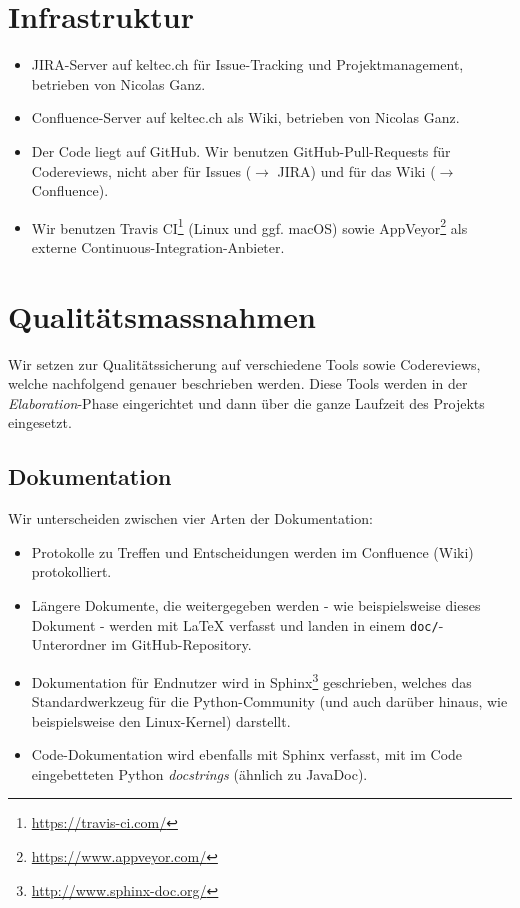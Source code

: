 \documentclass[a4paper]{article}
\let\oldsection\section
\renewcommand\section{\clearpage\oldsection}
\begin{document}
\oldsection{Infrastruktur}
\begin{itemize}
  \item JIRA-Server auf keltec.ch für Issue-Tracking und Projektmanagement, betrieben von Nicolas Ganz.
  \item Confluence-Server auf keltec.ch als Wiki, betrieben von Nicolas Ganz.
  \item Der Code liegt auf GitHub.
    Wir benutzen GitHub-Pull-Requests für Codereviews, nicht aber für Issues ($\rightarrow$ JIRA)
    und für das Wiki ($\rightarrow$ Confluence).
  \item Wir benutzen Travis CI\footnote{\url{https://travis-ci.com/}} (Linux und
    ggf. macOS) sowie AppVeyor\footnote{\url{https://www.appveyor.com/}} als
    externe Continuous-Integration-Anbieter.
\end{itemize}

\section{Qualitätsmassnahmen}
%

Wir setzen zur Qualitätssicherung auf verschiedene Tools sowie Codereviews,
welche nachfolgend genauer beschrieben werden. Diese Tools werden in der
\emph{Elaboration}-Phase eingerichtet und dann über die ganze Laufzeit des Projekts
eingesetzt.

\subsection{Dokumentation}

Wir unterscheiden zwischen vier Arten der Dokumentation:

\begin{itemize}
  \item Protokolle zu Treffen und Entscheidungen werden im Confluence (Wiki) protokolliert.
  \item Längere Dokumente, die weitergegeben werden - wie beispielsweise dieses Dokument - werden mit \LaTeX{} verfasst und landen in einem
    \texttt{doc/}-Unterordner im GitHub-Repository.
  \item Dokumentation für Endnutzer wird in
    Sphinx\footnote{\url{http://www.sphinx-doc.org/}} geschrieben, welches das
    Standardwerkzeug für die Python-Community (und auch darüber hinaus, wie
    beispielsweise den Linux-Kernel) darstellt.
  \item Code-Dokumentation wird ebenfalls mit Sphinx verfasst, mit im Code
    eingebetteten Python \emph{docstrings} (ähnlich zu JavaDoc).
\end{itemize}
\end{document}
